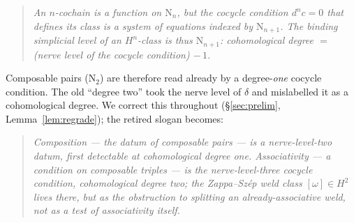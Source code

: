 \documentclass[11pt]{article}
\theoremstyle{definition}
\newcommand{\Nerve}{\mathrm{N}}
\begin{document}
\begin{quote}
\emph{An $n$-cochain is a function on $\Nerve_n$, but the cocycle condition $d^n c=0$ that defines its
class is a system of equations indexed by $\Nerve_{n+1}$. The binding simplicial level of an
$H^n$-class is thus $\Nerve_{n+1}$: cohomological degree $=$ (nerve level of the cocycle condition)
$-\,1$.}
\end{quote}

Composable pairs ($\Nerve_2$) are therefore read already by a degree-\emph{one} cocycle condition.
The old ``degree two'' took the nerve level of $\delta$ and mislabelled it as a cohomological degree.
We correct this throughout (\S\ref{sec:prelim}, Lemma~\ref{lem:regrade}); the retired slogan becomes:

\begin{quote}
\emph{Composition --- the datum of composable pairs --- is a nerve-level-two datum, first detectable
at cohomological degree one. Associativity --- a \emph{condition} on composable triples --- is the
nerve-level-three cocycle condition, cohomological degree two; the Zappa--Sz\'ep weld class
$[\omega]\in H^2$ lives there, but as the obstruction to \emph{splitting} an already-associative
weld, not as a test of associativity itself.}
\end{quote}
\end{document}
